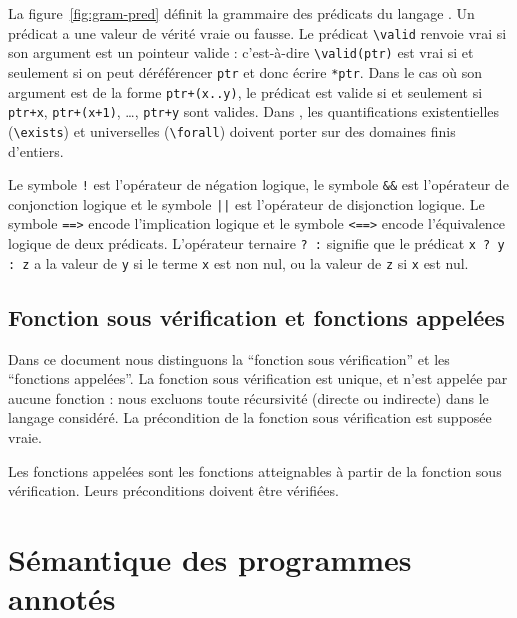 La figure~\ref{fig:gram-pred} définit la grammaire des prédicats du langage
\eacsl.
Un prédicat a une valeur de vérité vraie ou fausse.
Le prédicat \lstinline'\valid' renvoie vrai si son argument est un pointeur
valide : c'est-à-dire \lstinline'\valid(ptr)' est vrai si et seulement si
on peut déréférencer \lstinline'ptr' et donc écrire \lstinline'*ptr'.
Dans le cas où son argument est de la forme \lstinline'ptr+(x..y)', le prédicat
est valide si et seulement si \lstinline'ptr+x', \lstinline'ptr+(x+1)', \ldots,
\lstinline'ptr+y' sont valides.
Dans \eacsl, les quantifications existentielles (\lstinline'\exists') et
universelles (\lstinline'\forall') doivent porter sur des domaines finis
d'entiers.

Le symbole \lstinline'!' est l'opérateur de négation logique, le symbole
\lstinline'&&' est l'opérateur de conjonction logique et le symbole
\lstinline'||' est l'opérateur de disjonction logique.
Le symbole \lstinline'==>' encode l'implication logique et le symbole
\lstinline'<==>' encode l'équivalence logique de deux prédicats.
L'opérateur ternaire \lstinline'? :' signifie que le prédicat
\lstinline'x ? y : z' a la valeur de \lstinline'y' si le terme \lstinline'x' est
non nul, ou la valeur de \lstinline'z' si \lstinline'x' est nul.

\subsection{Fonction sous vérification et fonctions appelées}

Dans ce document nous distinguons la ``fonction sous vérification'' et les
``fonctions appelées''.
La fonction sous vérification est unique, et n'est appelée par aucune fonction :
nous excluons toute récursivité (directe ou indirecte) dans le langage
considéré.
La précondition de la fonction sous vérification est supposée vraie.

Les fonctions appelées sont les fonctions atteignables à partir de la fonction
sous vérification.
Leurs préconditions doivent être vérifiées.


\section{Sémantique des programmes annotés}
\label{sec:lang-semantics}


